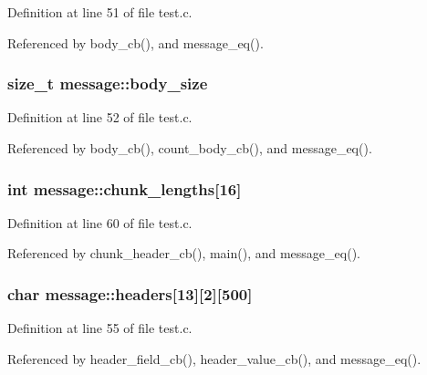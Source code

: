 Definition at line 51 of file test.\+c.



Referenced by body\+\_\+cb(), and message\+\_\+eq().

\subsubsection[{body\+\_\+size}]{\setlength{\rightskip}{0pt plus 5cm}size\+\_\+t message\+::body\+\_\+size}\label{structmessage_a76280f10b162e2690411c706a0900271}


Definition at line 52 of file test.\+c.



Referenced by body\+\_\+cb(), count\+\_\+body\+\_\+cb(), and message\+\_\+eq().

\subsubsection[{chunk\+\_\+lengths}]{\setlength{\rightskip}{0pt plus 5cm}int message\+::chunk\+\_\+lengths[16]}\label{structmessage_a6300614675d1bb2afc3e52fe054f809b}


Definition at line 60 of file test.\+c.



Referenced by chunk\+\_\+header\+\_\+cb(), main(), and message\+\_\+eq().

\subsubsection[{headers}]{\setlength{\rightskip}{0pt plus 5cm}char message\+::headers[13][2][500]}\label{structmessage_a16791247313276e8c4b62120d2694b60}


Definition at line 55 of file test.\+c.



Referenced by header\+\_\+field\+\_\+cb(), header\+\_\+value\+\_\+cb(), and message\+\_\+eq().

